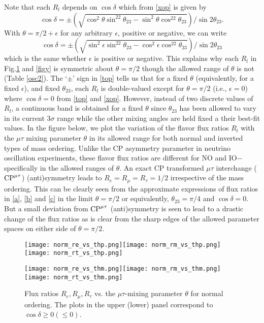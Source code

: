 \documentclass[11pt]{article}
\begin{document}
Note that each $R_l$ depends on $\cos\delta$ which from \eqref{xop} is given by \begin{equation}
\cos\delta=\pm(\sqrt{\cos^2\theta\sin^22\theta_{23}-\sin^2\theta\cos^22\theta_{23}})
/\sin2\theta_{23}.\end{equation} With $\theta=\pi/2+\epsilon$ for any arbitrary $\epsilon$, positive or negative, we can write \begin{equation}
\cos\delta=\pm(\sqrt{\sin^2\epsilon\sin^22\theta_{23}-\cos^2\epsilon\cos^22\theta_{23}})
/\sin2\theta_{23}\label{top}\end{equation} which is the same whether $\epsilon$ is positive or negative. This explains why each $R_l$ in Fig.\ref{figx} and \ref{figy} is symmetric about $\theta=\pi/2$ though the allowed range of $\theta$ is not (Table \ref{osc2}).  The `$\pm$' sign in \eqref{top} tells us that for a fixed $\theta$ (equivalently, for a fixed $\epsilon$), and fixed $\theta_{23}$, each $R_l$ is double-valued except for $\theta=\pi/2$ (i.e., $\epsilon=0$) where $\cos\delta=0$ from \eqref{top} and \eqref{xop}. However, instead of two discrete values of $R_l$, a continuous band is obtained for a fixed $\theta$ since $\theta_{23}$ has been allowed to vary in its current $3\sigma$ range while the other mixing angles are held fixed a their best-fit values. In the figure below, we plot the variation of the flavor flux ratios $R_{l}$ with the $\mu\tau$ mixing parameter $\theta$ in its allowed range for both normal and inverted types of mass ordering. Unlike the CP asymmetry parameter in neutrino oscillation experiments, these flavor flux ratios are different for NO and IO$-$specifically in the allowed ranges of $\theta$.  An exact CP transformed $\mu\tau$ interchange (${\rm CP}^{\mu\tau}$) (anti)symmetry leads to $R_e=R_\mu=R_\tau=1/2$ irrespective of the mass ordering. This can be clearly seen from the approximate expressions of flux ratios in \eqref{a}, \eqref{b} and \eqref{c} in the limit $\theta=\pi/2$ or equivalently, $\theta_{23}=\pi/4$ and $\cos\delta=0$. But a small deviation from ${\rm CP}^{\mu\tau}$ (anti)symmetry is seen to lead to a drastic change of the flux ratios as is clear from the sharp edges of the allowed parameter spaces on either side of $\theta=\pi/2$.


\begin{figure}[H]
\texttt{[image: norm\_re\_vs\_thp.png]}\texttt{[image: norm\_rm\_vs\_thp.png]}\texttt{[image: norm\_rt\_vs\_thp.png]}

\texttt{[image: norm\_re\_vs\_thm.png]}\texttt{[image: norm\_rm\_vs\_thm.png]}\texttt{[image: norm\_rt\_vs\_thm.png]}
\caption{Flux ratios $R_e, R_\mu, R_{\tau}$ vs. the $\mu\tau$-mixing parameter $\theta$ for normal ordering.  The plots in the upper (lower) panel correspond to $\cos\delta\geq 0(\leq 0)$.}\label{figx}
\end{figure}  
\noindent
\end{document}
